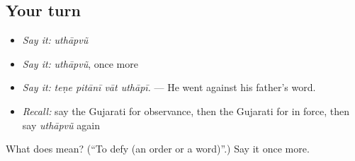 \subsection*{Your turn}
\begin{itemize}
\raggedright
  \item \emph{Say it:} \emph{uthāpvũ}
  \item \emph{Say it:} \emph{uthāpvũ}, once more
  \item \emph{Say it:} \emph{teṇe pitānī vāt uthāpī.} — He went against his father's word.
  \item \emph{Recall:} say the Gujarati for observance, then the Gujarati for in force, then say \emph{uthāpvũ} again
\end{itemize}

\begin{tcolorbox}[breakable,colback=teal!4,colframe=teal!35!black,title={Before you move on}]
What does  mean? (\textquotedblleft{}To defy (an order or a word)\textquotedblright{}.) Say it once more.
\end{tcolorbox}

